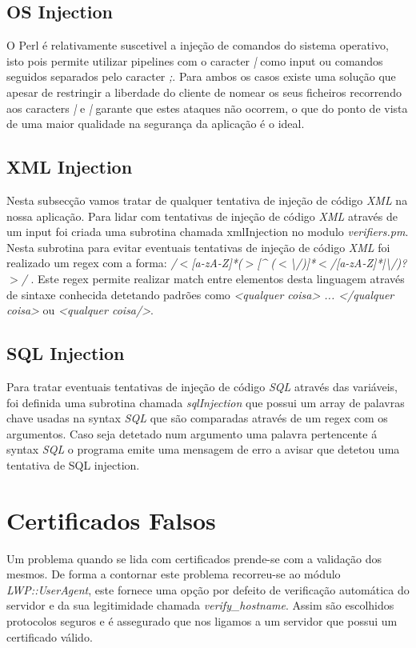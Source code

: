 \subsection{OS Injection}

O Perl é relativamente suscetivel a injeção de comandos do sistema operativo, isto pois permite utilizar pipelines com o caracter \textit{|} como input ou comandos seguidos separados pelo caracter \textit{;}. Para ambos os casos existe uma solução que apesar de restringir a liberdade do cliente de nomear os seus ficheiros recorrendo aos caracters \textit{|} e \textit{|} garante que estes ataques não ocorrem, o que do ponto de vista de uma maior qualidade na segurança da aplicação é o ideal.


\subsection{XML Injection}

Nesta subsecção vamos tratar de qualquer tentativa de injeção de código \textit{XML} na nossa aplicação. Para lidar com tentativas de injeção de código \textit{XML} através de um input foi criada uma subrotina chamada {xmlInjection} no modulo \textit{verifiers.pm}.\newline
Nesta subrotina para evitar eventuais tentativas de injeção de código \textit{XML} foi realizado um regex com a forma: \textit{/$<$[a-zA-Z]*($>$[\^{} ($<$\textbackslash/)]*$<$/[a-zA-Z]*|\textbackslash/)?$>$/} . Este regex permite realizar match entre elementos desta linguagem através de sintaxe conhecida detetando padrões como \textit{<qualquer coisa> ... </qualquer coisa>} ou \textit{<qualquer coisa/>}.

\subsection{SQL Injection}

Para tratar eventuais tentativas de injeção de código \textit{SQL} através das variáveis, foi definida uma subrotina chamada \textit{sqlInjection} que possui um array de palavras chave usadas na syntax \textit{SQL} que são comparadas através de um regex com os argumentos. Caso seja detetado num argumento uma palavra pertencente á syntax \textit{SQL} o programa emite uma mensagem de erro a avisar que detetou uma tentativa de SQL injection.

\section{Certificados Falsos}

Um problema quando se lida com certificados prende-se com a validação dos mesmos. De forma a contornar este problema recorreu-se ao módulo \textit{LWP::UserAgent}, este fornece uma opção por defeito de verificação automática do servidor e da sua legitimidade chamada \textit{verify\_hostname}. Assim são escolhidos protocolos seguros e é assegurado que nos ligamos a um servidor que possui um certificado válido.